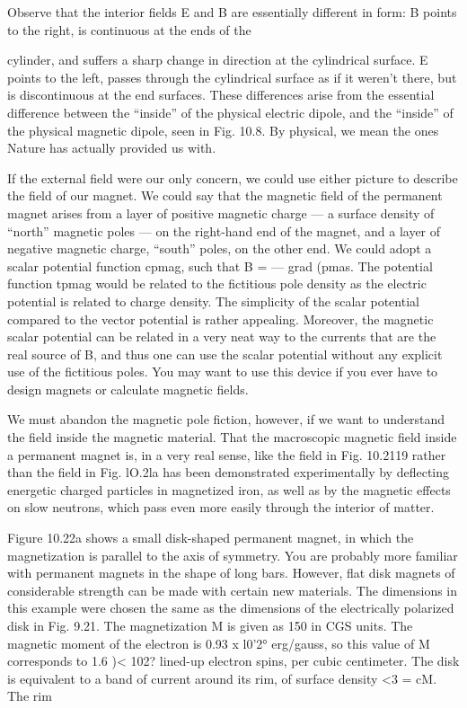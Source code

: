 {{{Observe that the interior fields E and B are essentially different
in form: B points to the right, is continuous at the ends of the

cylinder, and suffers a sharp change in direction at the cylindrical
surface. E points to the left, passes through the cylindrical surface
as if it weren't there, but is discontinuous at the end surfaces. These
differences arise from the essential difference between the ``inside''
of the physical electric dipole, and the ``inside'' of the physical magnetic
dipole, seen in Fig. 10.8. By physical, we mean the ones
Nature has actually provided us with.

If the external field were our only concern, we could use either
picture to describe the field of our magnet. We could say that the
magnetic field of the permanent magnet arises from a layer of positive
magnetic charge --- a surface density of ``north'' magnetic poles --- 
on the right-hand end of the magnet, and a layer of negative magnetic
charge, ``south'' poles, on the other end. We could adopt a scalar
potential function cpmag, such that B =  --- grad (pmas. The potential
function tpmag would be related to the fictitious pole density as the
electric potential is related to charge density. The simplicity of the
scalar potential compared to the vector potential is rather appealing.
Moreover, the magnetic scalar potential can be related in a very neat
way to the currents that are the real source of B, and thus one can use
the scalar potential without any explicit use of the fictitious poles.
You may want to use this device if you ever have to design magnets
or calculate magnetic fields.

We must abandon the magnetic pole fiction, however, if we want
to understand the field inside the magnetic material. That the
macroscopic magnetic field inside a permanent magnet is, in a very
real sense, like the field in Fig. 10.2119 rather than the field in
Fig. lO.2la has been demonstrated experimentally by deflecting
energetic charged particles in magnetized iron, as well as by the magnetic
effects on slow neutrons, which pass even more easily through
the interior of matter.

Figure 10.22a shows a small disk-shaped permanent magnet, in
which the magnetization is parallel to the axis of symmetry. You
are probably more familiar with permanent magnets in the shape of
long bars. However, flat disk magnets of considerable strength can
be made with certain new materials. The dimensions in this example
were chosen the same as the dimensions of the electrically polarized
disk in Fig. 9.21. The magnetization M is given as 150 in
CGS units. The magnetic moment of the electron is 0.93 x l0'2°
erg/gauss, so this value of M corresponds to 1.6 )< 102? lined-up
electron spins, per cubic centimeter. The disk is equivalent to a
band of current around its rim, of surface density <3 = cM. The rim

}}}

